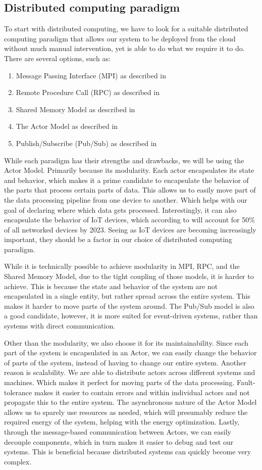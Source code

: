\documentclass[a4paper]{article}
\begin{document}
\subsection{Distributed computing paradigm}
To start with distributed computing, we have to look for a suitable distributed computing paradigm that allows our system to be deployed from the cloud without much manual intervention, yet is able to do what we require it to do. There are several options, such as:
\begin{enumerate}
    \item Message Passing Interface (MPI) as described in \cite{MPI}
    \item Remote Procedure Call (RPC) as described in \cite{RPC}
    \item Shared Memory Model as described in \cite{SMM}
    \item The Actor Model as described in \cite{ActorModel}
    \item Publish/Subscribe (Pub/Sub) as described in \cite{PubSub}
\end{enumerate}
While each paradigm has their strengths and drawbacks, we will be using the Actor Model. Primarily because its modularity. Each actor encapsulates its state and behavior, which makes it a prime candidate to encapsulate the behavior of the parts that process certain parts of data. This allows us to easily move part of the data processing pipeline from one device to another. Which helps with our goal of declaring where which data gets processed. Interestingly, it can also encapsulate the behavior of IoT devices, which according to \cite{differentnetworkneedsiot} will account for 50\% of all networked devices by 2023. Seeing as IoT devices are becoming increasingly important, they should be a factor in our choice of distributed computing paradigm.

While it is technically possible to achieve modularity in MPI, RPC, and the Shared Memory Model, due to the tight coupling of those models, it is harder to achieve. This is because the state and behavior of the system are not encapsulated in a single entity, but rather spread across the entire system. This makes it harder to move parts of the system around. The Pub/Sub model is also a good candidate, however, it is more suited for event-driven systems, rather than systems with direct communication.

Other than the modularity, we also choose it for its maintainability. Since each part of the system is encapsulated in an Actor, we can easily change the behavior of parts of the system, instead of having to change our entire system. Another reason is scalability. We are able to distribute actors across different systems and machines. Which makes it perfect for moving parts of the data processing. Fault-tolerance makes it easier to contain errors and within individual actors and not propagate this to the entire system. The asynchronous nature of the Actor Model allows us to sparely use resources as needed, which will presumably reduce the required energy of the system, helping with the energy optimization. Lastly, through the message-based communication between Actors, we can easily decouple components, which in turn makes it easier to debug and test our systems. This is beneficial because distributed systems can quickly become very complex.
\end{document}
